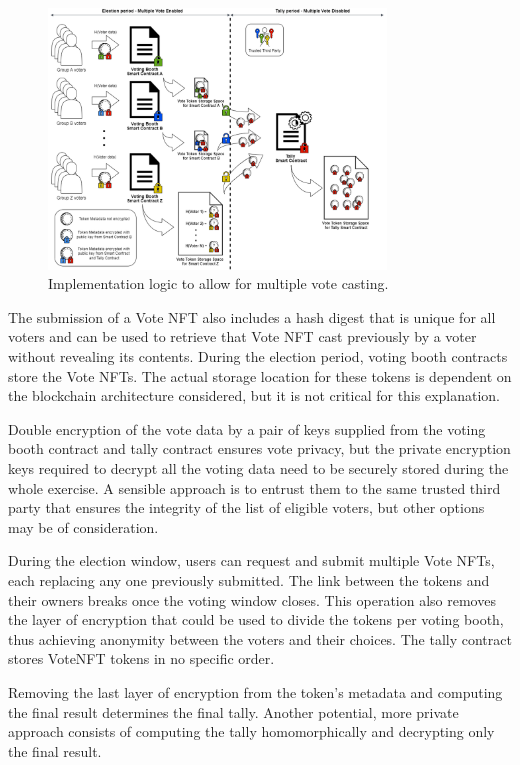 \documentclass[../main.tex]{subfiles}
\begin{document}
\begin{figure}[htp]
    \centering
    \includegraphics[width=0.8\textwidth]{../Images/MultipleVoteCastingLogic.png}
    \caption{Implementation logic to allow for multiple vote casting.}
    \label{fig:multiple_vote_casting}
\end{figure}


The submission of a Vote NFT also includes a hash digest that is unique for all voters and can be used to retrieve that Vote NFT cast previously by a voter without revealing its contents. During the election period, voting booth contracts store the Vote NFTs. The actual storage location for these tokens is dependent on the blockchain architecture considered, but it is not critical for this explanation.
\par
Double encryption of the vote data by a pair of keys supplied from the voting booth contract and tally contract ensures vote privacy, but the private encryption keys required to decrypt all the voting data need to be securely stored during the whole exercise. A sensible approach is to entrust them to the same trusted third party that ensures the integrity of the list of eligible voters, but other options may be of consideration.
\par
During the election window, users can request and submit multiple Vote NFTs, each replacing any one previously submitted. The link between the tokens and their owners breaks once the voting window closes. This operation also removes the layer of encryption that could be used to divide the tokens per voting booth, thus achieving anonymity between the voters and their choices. The tally contract stores VoteNFT tokens in no specific order.
\par
Removing the last layer of encryption from the token's metadata and computing the final result determines the final tally. Another potential, more private approach consists of computing the tally homomorphically and decrypting only the final result.
\end{document}
